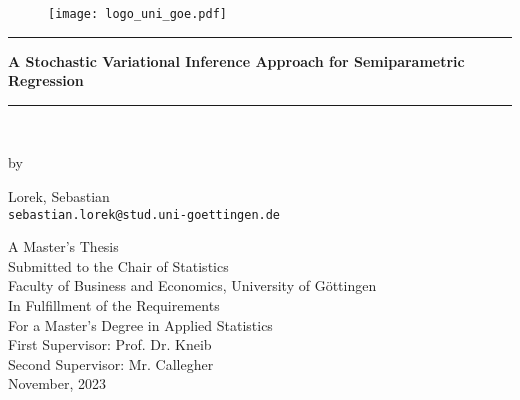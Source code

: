 \thispagestyle{empty}

\vspace*{\fill}

\begin{figure}[htbp]
  \centering
  \texttt{[image: logo\_uni\_goe.pdf]}
\end{figure}

\bigskip

\begin{center}

\rule{\linewidth}{0.5mm}

{\Large \textbf{A Stochastic Variational Inference Approach for Semiparametric Regression}}

\rule{\linewidth}{0.5mm} \\

\end{center}

\bigskip

\begin{center}

by \\

\bigskip

Lorek, Sebastian \\
\texttt{sebastian.lorek@stud.uni-goettingen.de}

\end{center}

\bigskip

\begin{center}

A Master's Thesis \\
Submitted to the Chair of Statistics \\
Faculty of Business and Economics, University of Göttingen \\
In Fulfillment of the Requirements \\
For a Master's Degree in Applied Statistics\\
First Supervisor: Prof. Dr. Kneib \\
Second Supervisor: Mr. Callegher \\
November, 2023 \\

\end{center}


\vspace*{\fill}

\clearpage
{}

